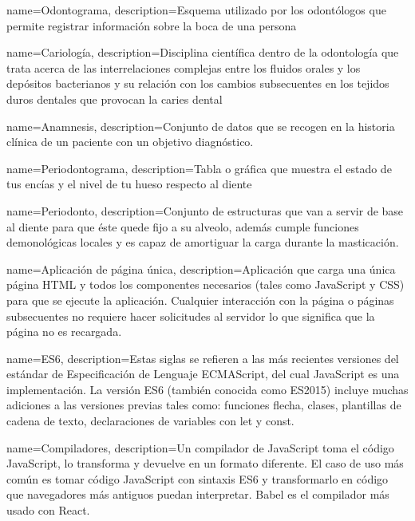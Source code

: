 
{
    name=Odontograma,
    description={Esquema utilizado por los odontólogos que permite registrar información sobre la boca de una persona}
}

{
    name=Cariología,
    description={Disciplina científica dentro de la odontología que trata acerca de las interrelaciones complejas entre los fluidos orales y los depósitos bacterianos y su relación con los cambios subsecuentes en los tejidos duros dentales que provocan la caries dental}
}

{
    name=Anamnesis,
    description={Conjunto de datos que se recogen en la historia clínica de un paciente con un objetivo diagnóstico.}
}


{
    name=Periodontograma,
    description={Tabla o gráfica que muestra el estado de tus encías y el nivel de tu hueso respecto al diente}
}

{
    name=Periodonto,
    description={Conjunto de estructuras que van a servir de base al diente para que éste quede fijo a su alveolo, además cumple funciones demonológicas locales y es capaz de amortiguar la carga durante la masticación.}
}



{
    name=Aplicación de página única,
    description={Aplicación que carga una única página HTML y todos los componentes necesarios (tales como JavaScript y CSS) para que se ejecute la aplicación. Cualquier interacción con la página o páginas subsecuentes no requiere hacer solicitudes al servidor lo que significa que la página no es recargada.}
}

{
    name=ES6,
    description={Estas siglas se refieren a las más recientes versiones del estándar de Especificación de Lenguaje ECMAScript, del cual JavaScript es una implementación. La versión ES6 (también conocida como ES2015) incluye muchas adiciones a las versiones previas tales como: funciones flecha, clases, plantillas de cadena de texto, declaraciones de variables con let y const. }
}

{
    name=Compiladores,
    description={Un compilador de JavaScript toma el código JavaScript, lo transforma y devuelve en un formato diferente. El caso de uso más común es tomar código JavaScript con sintaxis ES6 y transformarlo en código que navegadores más antiguos puedan interpretar. Babel es el compilador más usado con React. }
}

